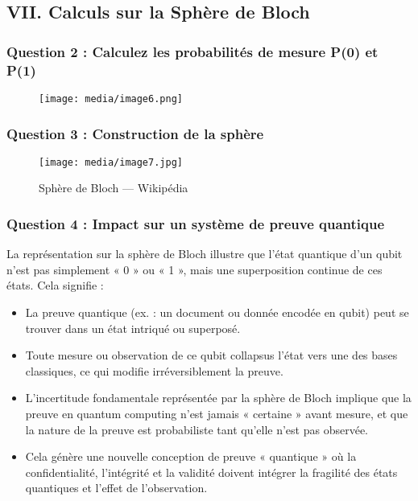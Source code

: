 \documentclass[12pt, a4paper]{article}
\begin{document}
		\subsection*{VII. Calculs sur la Sphère de Bloch}
		
		\subsubsection*{Question 2 : Calculez les probabilités de mesure P(0) et P(1)}
		
		\begin{figure}[H]
			\centering
			\texttt{[image: media/image6.png]}
		\end{figure}
		
		\subsubsection*{Question 3 : Construction de la sphère}
		
		\begin{figure}[H]
			\centering
			\texttt{[image: media/image7.jpg]}
			\caption{Sphère de Bloch --- Wikipédia}
		\end{figure}
		
		\subsubsection*{Question 4 : Impact sur un système de preuve quantique}
		
		La représentation sur la sphère de Bloch illustre que l'état quantique d'un qubit n'est pas simplement « 0 » ou « 1 », mais une superposition continue de ces états. Cela signifie :
		
		\begin{itemize}
			\item La preuve quantique (ex. : un document ou donnée encodée en qubit) peut se trouver dans un état intriqué ou superposé.
			\item Toute mesure ou observation de ce qubit collapsus l'état vers une des bases classiques, ce qui modifie irréversiblement la preuve.
			\item L'incertitude fondamentale représentée par la sphère de Bloch implique que la preuve en quantum computing n'est jamais « certaine » avant mesure, et que la nature de la preuve est probabiliste tant qu'elle n'est pas observée.
			\item Cela génère une nouvelle conception de preuve « quantique » où la confidentialité, l'intégrité et la validité doivent intégrer la fragilité des états quantiques et l'effet de l'observation.
		\end{itemize}
		
\end{document}
